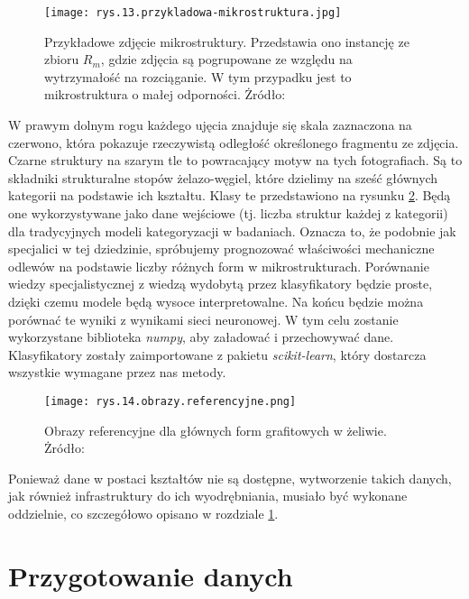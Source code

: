 \begin{figure}[h]
    \centering
    \texttt{[image: rys.13.przykladowa-mikrostruktura.jpg]}
    \caption{Przykładowe zdjęcie mikrostruktury. Przedstawia ono instancję ze zbioru $R_m$, gdzie zdjęcia są pogrupowane ze względu na wytrzymałość na rozciąganie. W tym przypadku jest to mikrostruktura o małej odporności. Żródło: \cite{Pirowski17}}
    \label{fig:mesh13}
\end{figure}
W prawym dolnym rogu każdego ujęcia znajduje się skala zaznaczona na czerwono, która pokazuje rzeczywistą odległość określonego fragmentu ze zdjęcia. Czarne struktury na szarym tle to powracający motyw na tych fotografiach. Są to składniki strukturalne stopów żelazo-węgiel, które dzielimy na sześć głównych kategorii na podstawie ich kształtu. Klasy te przedstawiono na rysunku \ref{fig:mesh14}. Będą one wykorzystywane jako dane wejściowe (tj. liczba struktur każdej z kategorii) dla tradycyjnych modeli kategoryzacji w badaniach. Oznacza to, że podobnie jak specjalici w tej dziedzinie, spróbujemy prognozować właściwości mechaniczne odlewów na podstawie liczby różnych form w mikrostrukturach. Porównanie wiedzy specjalistycznej z wiedzą wydobytą przez klasyfikatory będzie proste, dzięki czemu modele będą wysoce interpretowalne. Na końcu będzie można porównać te wyniki z wynikami sieci neuronowej. W tym celu zostanie wykorzystane biblioteka \textit{numpy}, aby załadować i przechowywać dane. Klasyfikatory zostały zaimportowane z pakietu \textit{scikit-learn}, który dostarcza wszystkie wymagane przez nas metody. 
\begin{figure}[h]
    \centering
    \texttt{[image: rys.14.obrazy.referencyjne.png]}
    \caption{Obrazy referencyjne dla głównych form grafitowych w żeliwie. Żródło: \cite{norma}}
    \label{fig:mesh14}
\end{figure}
Ponieważ dane w postaci kształtów nie są dostępne, wytworzenie takich danych, jak również infrastruktury do ich wyodrębniania, musiało być wykonane oddzielnie, co szczegółowo opisano w rozdziale \ref{sec:przygotowanie_danych}.

\section{Przygotowanie danych}
\label{sec:przygotowanie_danych}

